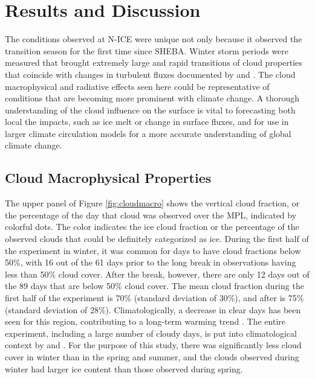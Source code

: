 \section{Results and Discussion}
The conditions observed at N-ICE were unique not only because it observed the transition season for the first time since SHEBA. Winter storm periods were measured that brought extremely large and rapid transitions of cloud properties that coincide with changes in turbulent fluxes documented by \citet{walden:2017} and \citet{graham:2017}. The cloud macrophysical and radiative effects seen here could be representative of conditions that are becoming more prominent with climate change. A thorough understanding of the cloud influence on the surface is vital to forecasting both local the impacts, such as ice melt or change in surface fluxes, and for use in larger climate circulation models for a more accurate understanding of global climate change. 

\subsection{Cloud Macrophysical Properties}
The upper panel of Figure \ref{fig:cloudmacro} shows the vertical cloud fraction, or the percentage of the day that cloud was observed over the MPL, indicated by colorful dots. The color indicates the ice cloud fraction or the percentage of the observed clouds that could be definitely categorized as ice. During the first half of the experiment in winter, it was common for days to have cloud fractions below 50$\%$, with 16 out of the 61 days prior to the long break in observations having less than 50$\%$ cloud cover. After the break, however, there are only 12 days out of the 89 days that are below 50$\%$ cloud cover. The mean cloud fraction during the first half of the experiment is 70$\%$ (standard deviation of 30$\%$), and after is 75$\%$ (standard deviation of 28$\%$). Climatologically, a decrease in clear days has been seen for this region, contributing to a long-term warming trend \citep{kayser:2017}. The entire experiment, including a large number of cloudy days, is put into climatological context by \citet{graham:2017} and \citet{kayser:2017}. For the purpose of this study, there was significantly less cloud cover in winter than in the spring and summer, and the clouds observed during winter had larger ice content than those observed during spring.

